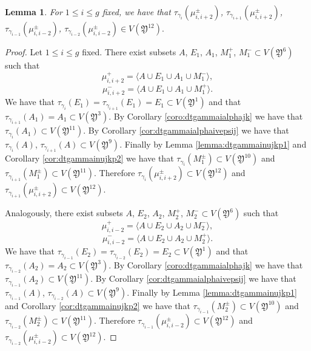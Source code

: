 \documentclass{artv3}
\newtheorem{lemma}[theorem]{Lemma}
\newcommand*{\dt}[1]{\tau_{#1}}
\newcommand*{\Y}{\mathfrak{Y}}
\begin{document}
\begin{lemma}\label{lemma:dtgammaimupmiip2m2}
For $1\leq i \leq g$ fixed, we have that $\dt{\gamma_i}(\mu_{i,i+2}^{\pm})$, $\dt{\gamma_{i+1}}(\mu_{i,i+2}^{\pm})$, $\dt{\gamma_{i-1}}(\mu_{i,i-2}^{\pm})$, $\dt{\gamma_{i-2}}(\mu_{i,i-2}^{\pm}) \in V(\Y^{12}).$
\end{lemma}
\begin{proof}
Let $1\leq i \leq g$ fixed. There exist subsets $A$, $E_1$, $A_1$, $M_{1}^{+}$, $M_{1}^{-}\subset V(\Y^{6})$ such that  
$$\mu_{i,i+2}^{+} = \langle A\cup E_1\cup A_1\cup M_{1}^{-}\rangle,$$  
$$\mu_{i,i+2}^{-} = \langle A\cup E_1\cup A_1\cup M_{1}^{+}\rangle.$$
We have that $\dt{\gamma_i}(E_1) = \dt{\gamma_{i+1}}(E_1)= E_1\subset V(\Y^1)$ and that $\dt{\gamma_{i+1}}(A_1)=A_1 \subset V(\Y^{3})$. By Corollary \ref{coro:dtgammaialphajk} we have that $\dt{\gamma_i}(A_1)\subset V(\Y^{11})$. By Corollary \ref{cor:dtgammaialphaivepsij} we have that $\dt{\gamma_i}(A)$, $\dt{\gamma_{i+1}}(A)\subset V(\Y^{9})$. Finally by Lemma \ref{lemma:dtgammainujkp1} and Corollary \ref{cor:dtgammainujkp2} we have that $\dt{\gamma_{i}}(M_{1}^{\pm})\subset V(\Y^{10})$ and $\dt{\gamma_{i+1}}(M_{1}^{\pm})\subset V(\Y^{11})$. Therefore $\dt{\gamma_{i}}(\mu_{i,i+2}^{\pm})\subset V(\Y^{12})$ and $\dt{\gamma_{i+1}}(\mu_{i,i+2}^{\pm}) \subset V(\Y^{12})$.

Analogously, there exist subsets $A$, $E_2$, $A_2$, $M_{2}^{+}$, $M_{2}^{-}\subset V(\Y^{6})$ such that  
$$\mu_{i,i-2}^{+} = \langle A\cup E_2\cup A_2\cup M_{2}^{-}\rangle,$$  
$$\mu_{i,i-2}^{-} = \langle A\cup E_2\cup A_2\cup M_{2}^{+}\rangle.$$
We have that $\dt{\gamma_{i-1}}(E_2) = \dt{\gamma_{i-2}}(E_2)= E_2 \subset V(\Y^1)$ and that $\dt{\gamma_{i-2}}(A_2)=A_2 \subset V(\Y^{3})$. By Corollary \ref{coro:dtgammaialphajk} we have that $\dt{\gamma_{i-1}}(A_2)\subset V(\Y^{11})$. By Corollary \ref{cor:dtgammaialphaivepsij} we have that $\dt{\gamma_{i-1}}(A)$, $\dt{\gamma_{i-2}}(A)\subset V(\Y^{9})$. Finally by Lemma \ref{lemma:dtgammainujkp1} and Corollary \ref{cor:dtgammainujkp2} we have that $\dt{\gamma_{i-1}}(M_{2}^{\pm})\subset V(\Y^{10})$ and $\dt{\gamma_{i-2}}(M_{2}^{\pm})\subset V(\Y^{11})$. Therefore $\dt{\gamma_{i-1}}(\mu_{i,i-2}^{\pm})\subset V(\Y^{12})$ and $\dt{\gamma_{i-2}}(\mu_{i,i-2}^{\pm}) \subset V(\Y^{12})$.

\end{proof}
\end{document}
